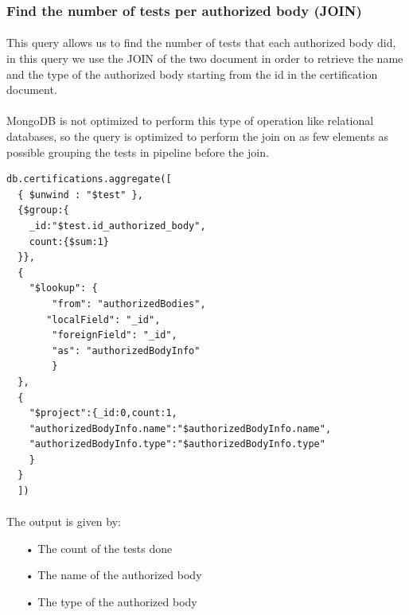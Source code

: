 \documentclass[a4paper,12pt]{article}
\begin{document}
\subsubsection{Find the number of tests per authorized body (JOIN) }
\paragraph{} This query allows us to find the number of tests that each authorized body did, in this query we use the JOIN of the two document in order to retrieve the name and the type of the authorized body starting from the id in the certification document. 
\paragraph{}MongoDB is not optimized to perform this type of operation like relational databases, so the query is optimized to perform the join on as few elements as possible grouping the tests in pipeline before the join.

\begin{tcolorbox}[colback=green!5!white,colframe=green!75!black,title=QUERY]
\begin{verbatim}
db.certifications.aggregate([
  { $unwind : "$test" },
  {$group:{
    _id:"$test.id_authorized_body",
    count:{$sum:1}
  }},
  {
    "$lookup": {
        "from": "authorizedBodies",
       "localField": "_id",
        "foreignField": "_id",
        "as": "authorizedBodyInfo"
        }
  },
  {
    "$project":{_id:0,count:1,
    "authorizedBodyInfo.name":"$authorizedBodyInfo.name",
    "authorizedBodyInfo.type":"$authorizedBodyInfo.type"
    }
  }
  ])
\end{verbatim}
\end{tcolorbox}

\paragraph{} The output is given by: 
\begin{itemize}[noitemsep]
\item[•] The count of the tests done
\item[•] The name of the authorized body
\item[•] The type of the authorized body
\end{itemize}
\end{document}
